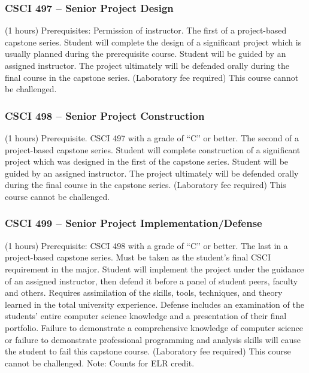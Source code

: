 \subsubsection{CSCI 497 -- Senior Project Design}
(1 hours) Prerequisites: Permission of instructor. The first of a project-based capstone series. Student will complete the design of a significant project which is usually planned during the prerequisite course. Student will be guided by an assigned instructor. The project ultimately will be defended orally during the final course in the capstone series. (Laboratory fee required) This course cannot be challenged.

\clearpage

\subsubsection{CSCI 498 -- Senior Project Construction}
(1 hours) Prerequisite. CSCI 497 with a grade of “C” or better. The second of a project-based capstone series. Student will complete construction of a significant project which was designed in the first of the capstone series. Student will be guided by an assigned instructor. The project ultimately will be defended orally during the final course in the capstone series. (Laboratory fee required) This course cannot be challenged.

\subsubsection{CSCI 499 -- Senior Project Implementation/Defense}
(1 hours) Prerequisite: CSCI 498 with a grade of “C” or better. The last in a project-based capstone series. Must be taken as the student’s final CSCI requirement in the major. Student will implement the project under the guidance of an assigned instructor, then defend it before a panel of student peers, faculty and others. Requires assimilation of the skills, tools, techniques, and theory learned in the total university experience. Defense includes an examination of the students’ entire computer science knowledge and a presentation of their final portfolio. Failure to demonstrate a comprehensive knowledge of computer science or failure to demonstrate professional programming and analysis skills will cause the student to fail this capstone course. (Laboratory fee required) This course cannot be challenged. Note: Counts for ELR credit.

